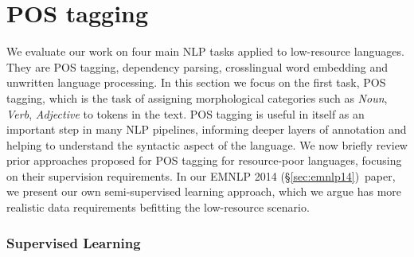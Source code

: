 \documentclass[12pt,twoside,final,hidelinks]{ltthesis}
\theoremstyle{definition}
\newcommand\emnlpiv{EMNLP 2014 (\S\ref{sec:emnlp14})}
\begin{document}
\section{POS tagging}
We evaluate our work on four main NLP tasks applied to low-resource languages. They are POS tagging, dependency parsing, crosslingual word embedding and unwritten language processing. In this section we focus on the first task, POS tagging, which is the task of 
assigning morphological categories such as \textit{Noun}, \textit{Verb}, \textit{Adjective} to tokens in the text. POS tagging is useful in itself as an 
important step in many NLP pipelines, informing deeper layers of annotation and helping to understand the syntactic aspect of the language. We now briefly review prior 
approaches proposed for POS tagging for resource-poor languages, focusing on their supervision requirements. In our \emnlpiv\ paper, we present our own semi-supervised learning approach, which we argue has more realistic data requirements befitting the low-resource scenario. 
\subsubsection{Supervised Learning}
\end{document}
